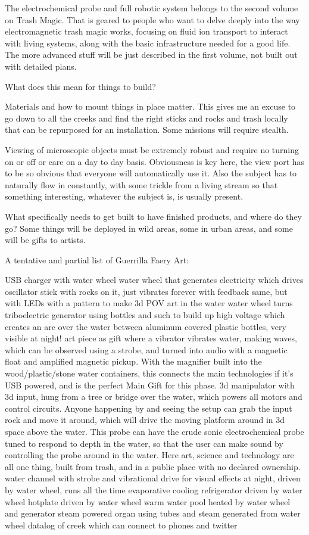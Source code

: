 The electrochemical probe and full robotic system belongs to the second
volume on Trash Magic. That is geared to people who want to delve deeply
into the way electromagnetic trash magic works, focusing on fluid ion
transport to interact with living systems, along with the basic
infrastructure needed for a good life. The more advanced stuff will be
just described in the first volume, not built out with detailed plans.

What does this mean for things to build?

Materials and how to mount things in place matter. This gives me an
excuse to go down to all the creeks and find the right sticks and rocks
and trash locally that can be repurposed for an installation. Some
missions will require stealth.

Viewing of microscopic objects must be extremely robust and require no
turning on or off or care on a day to day basis. Obviousness is key
here, the view port has to be so obvious that everyone will
automatically use it. Also the subject has to naturally flow in
constantly, with some trickle from a living stream so that something
interesting, whatever the subject is, is usually present.

What specifically needs to get built to have finished products, and
where do they go? Some things will be deployed in wild areas, some in
urban areas, and some will be gifts to artists.

A tentative and partial list of Guerrilla Faery Art:

USB charger with water wheel water wheel that generates electricity
which drives oscillator stick with rocks on it, just vibrates forever
with feedback same, but with LEDs with a pattern to make 3d POV art in
the water water wheel turns triboelectric generator using bottles and
such to build up high voltage which creates an arc over the water
between aluminum covered plastic bottles, very visible at night! art
piece as gift where a vibrator vibrates water, making waves, which can
be observed using a strobe, and turned into audio with a magnetic float
and amplified magnetic pickup. With the magnifier built into the
wood/plastic/stone water containers, this connects the main technologies
if it's USB powered, and is the perfect Main Gift for this phase. 3d
manipulator with 3d input, hung from a tree or bridge over the water,
which powers all motors and control circuits. Anyone happening by and
seeing the setup can grab the input rock and move it around, which will
drive the moving platform around in 3d space above the water. This probe
can have the crude sonic electrochemical probe tuned to respond to depth
in the water, so that the user can make sound by controlling the probe
around in the water. Here art, science and technology are all one thing,
built from trash, and in a public place with no declared ownership.
water channel with strobe and vibrational drive for visual effects at
night, driven by water wheel, runs all the time evaporative cooling
refrigerator driven by water wheel hotplate driven by water wheel warm
water pool heated by water wheel and generator steam powered organ using
tubes and steam generated from water wheel datalog of creek which can
connect to phones and twitter

